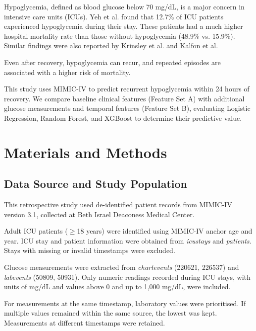 \documentclass[twocolumn, 8pt]{article}
\begin{document}
Hypoglycemia, defined as blood glucose below 70 mg/dL, is a major concern in intensive care units (ICUs).\cite{ada2026hospital} Yeh et al.\cite{yeh2025hypoglycemia} found that 12.7\% of ICU patients experienced hypoglycemia during their stay. These patients had a much higher hospital mortality rate than those without hypoglycemia (48.9\% vs. 15.9\%). Similar findings were also reported by Krinsley et al.\cite{krinsley2011mild} and Kalfon et al.\cite{kalfon2015severe}

Even after recovery, hypoglycemia can recur, and repeated episodes are associated with a higher risk of mortality.\cite{dnetto2016predictors,kalfon2015severe}

This study uses MIMIC-IV to predict recurrent hypoglycemia within 24 hours of recovery. We compare baseline clinical features (Feature Set A) with additional glucose measurements and temporal features (Feature Set B), evaluating Logistic Regression, Random Forest, and XGBoost to determine their predictive value.


\section{Materials and Methods}
\label{sec:methods}

\subsection{Data Source and Study Population}
\label{sec:data}

This retrospective study used de-identified patient records from MIMIC-IV version 3.1, collected at Beth Israel Deaconess Medical Center.\cite{johnson2023mimiciv,johnson2024mimiciv31}

Adult ICU patients ($\geq$18 years) were identified using MIMIC-IV anchor age and year. ICU stay and patient information were obtained from \textit{icustays} and \textit{patients}. Stays with missing or invalid timestamps were excluded.

Glucose measurements were extracted from \textit{chart\-events} (220621, 226537) and \textit{lab\-events} (50809, 50931). Only numeric readings recorded during ICU stays, with units of mg/dL and values above 0 and up to 1,000 mg/dL, were included.

For measurements at the same timestamp, laboratory values were prioritised. If multiple values remained within the same source, the lowest was kept. Measurements at different timestamps were retained.
\end{document}
